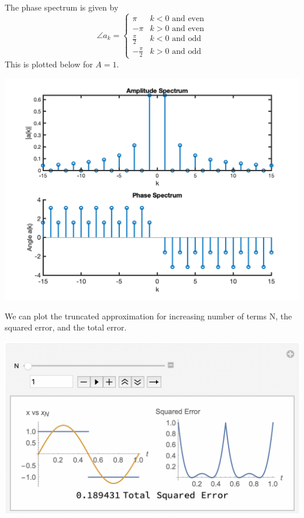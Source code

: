 \begin{example}
  The phase spectrum is given by
  \[
  \angle a_k = \left\{ \begin{array}{lc}
    \pi & k < 0 \mbox{ and even}\\
    -\pi & k > 0 \mbox{ and even}\\
    \frac{\pi}{2} & k < 0 \mbox{ and odd}\\
    -\frac{\pi}{2} & k > 0 \mbox{ and odd}\end{array}\right.
  \]
  This is plotted below for $A = 1$.
  \begin{center}
    \includegraphics[scale=0.7]{graphics/ctfs_exampleplot2.png}
  \end{center}
  We can plot the truncated approximation for increasing number of terms N, the squared error, and the total error.
  \begin{center}
    \includegraphics[scale=0.5]{graphics/squarewaveapprox1.png}
  \end{center}

\end{example}
